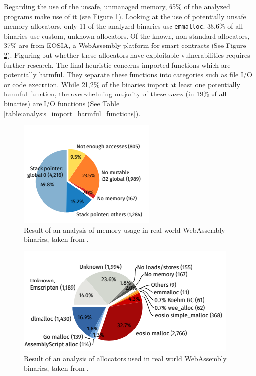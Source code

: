 \documentclass[sigconf]{acmart}
\begin{document}
Regarding the use of the unsafe, unmanaged memory, 65\% of the analyzed programs make use of it (see Figure \ref{fig:analysis_unmanaged_stack}). Looking at the use of potentially unsafe memory allocators, only 11 of the analyzed binaries use \texttt{emmalloc}. 38,6\% of all binaries use custom, unknown allocators. Of the known, non-standard allocators, 37\% are from EOSIA, a WebAssembly platform for smart contracts (See Figure \ref{fig:analysis_used_alloc}). Figuring out whether these allocators have exploitable vulnerabilities requires further research. The final heuristic concerns imported functions which are potentially harmful. They separate these functions into categories such as file I/O or code execution. While 21,2\% of the binaries import at least one potentially harmful function, the overwhelming majority of these cases (in 19\% of all binaries) are I/O functions (See Table \ref{table:analysis_import_harmful_functions}). 

\begin{figure}[h]
  \centering
  \includegraphics[scale=.8]{analysis_unmanaged_stack}
  \caption{Result of an analysis of memory usage in real world WebAssembly binaries, taken from \cite{hilbig_empirical_2021}.}  
\label{fig:analysis_unmanaged_stack}
\end{figure}

\begin{figure}[h]
  \centering
  \includegraphics[scale=.8]{analysis_used_alloc}
  \caption{Result of an analysis of allocators used in real world WebAssembly binaries, taken from \cite{hilbig_empirical_2021}.}  
\label{fig:analysis_used_alloc}
\end{figure}
\end{document}
